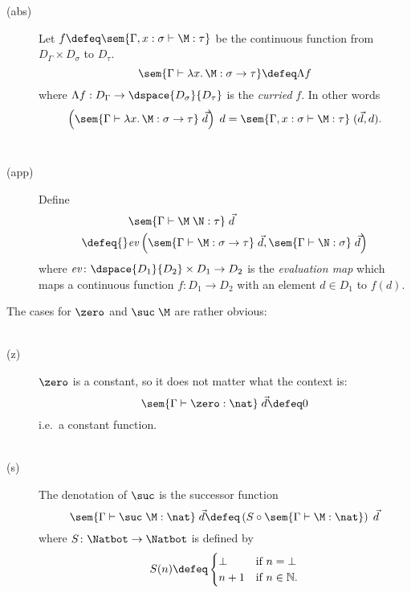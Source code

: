 \begin{frame}
  \begin{description}
    \item[(abs)] Let $f \defeq \sem{\Gamma, x : \sigma \vdash \M : \tau}$
      be the continuous function from $D_\Gamma \times D_\sigma$
      to $D_\tau$.
      \[ 
        \sem{\Gamma \vdash \lambda x.\, \M : \sigma \to \tau} \defeq
        \Lambda f
      \]
      where $\Lambda f: D_\Gamma \to \dspace{D_\sigma}{D_\tau}$ is the
      \emph{curried} $f$. In other words
      \[
        \left(\sem{\Gamma \vdash \lambda x.\, \M :
            \sigma\to\tau}\;\vec{d}\right)\; d = \sem{\Gamma, x : \sigma \vdash
          \M : \tau}\; (\vec{d}, d).
      \]
      ~\\
    \item[(app)] Define
      \begin{align*}
        & \sem{\Gamma \vdash \M\;\N : \tau}\; \vec{d} \\
        \defeq{} & \mathit{ev}\left(
        \sem{\Gamma \vdash
          \M : \sigma \to \tau}\; \vec{d}, \sem{\Gamma \vdash \N :
          \sigma}\; \vec{d} \right)
      \end{align*}
      where $\mathit{ev}\colon \dspace{D_1}{D_2} \times D_1 \to D_2$ is the
      \emph{evaluation map} which maps a continuous function $f\colon D_1 \to
      D_2$ with an element $d \in D_1$ to $f(d)$.
  \end{description}
\end{frame}

\begin{frame}
  The cases for $\zero$ and $\suc\;\M$ are rather obvious:
  \\~\\
  \begin{description}
    \item[(z)] $\zero$ is a constant, so it does not matter what the context is:
      \[
        \sem{\Gamma \vdash \zero : \nat}\; \vec{d} \defeq 0
      \]
      i.e.\ a constant function. 
      \\~\\
    \item[(s)] The denotation of $\suc$ is the successor function
      \[
        \sem{\Gamma \vdash \suc\;\M : \nat}\;\vec{d} \defeq
        \left (S \circ \sem{\Gamma
          \vdash \M : \nat} \right)\;\vec{d}
      \]
      where $S\colon \Natbot \to \Natbot$ is defined by
          \[
            S(n) \defeq
            \begin{cases}
              \bot & \text{if $n = \bot$} \\
              n + 1 & \text{if $n \in \mathbb{N}$.}
            \end{cases}
          \]
\end{description}
\end{frame}

